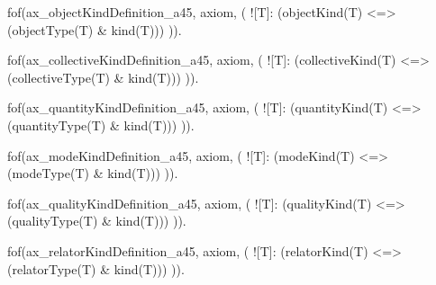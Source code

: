 
fof(ax_objectKindDefinition_a45, axiom, (
  ![T]: (objectKind(T) <=> (objectType(T) & kind(T)))
)).

fof(ax_collectiveKindDefinition_a45, axiom, (
  ![T]: (collectiveKind(T) <=> (collectiveType(T) & kind(T)))
)).

fof(ax_quantityKindDefinition_a45, axiom, (
  ![T]: (quantityKind(T) <=> (quantityType(T) & kind(T)))
)).

fof(ax_modeKindDefinition_a45, axiom, (
  ![T]: (modeKind(T) <=> (modeType(T) & kind(T)))
)).

fof(ax_qualityKindDefinition_a45, axiom, (
  ![T]: (qualityKind(T) <=> (qualityType(T) & kind(T)))
)).

fof(ax_relatorKindDefinition_a45, axiom, (
  ![T]: (relatorKind(T) <=> (relatorType(T) & kind(T)))
)).









